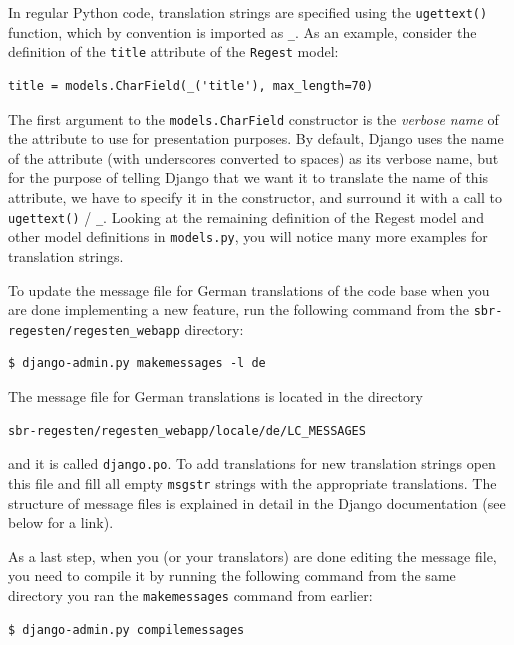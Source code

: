 In regular Python code, translation strings are specified using the
\texttt{ugettext()} function, which by convention is imported as
\texttt{\_}. As an example, consider the definition of the
\texttt{title} attribute of the \texttt{Regest} model:

\begin{verbatim}
title = models.CharField(_('title'), max_length=70)
\end{verbatim}

The first argument to the \texttt{models.CharField} constructor is the
\emph{verbose name} of the attribute to use for presentation purposes.
By default, Django uses the name of the attribute (with underscores
converted to spaces) as its verbose name, but for the purpose of
telling Django that we want it to translate the name of this
attribute, we have to specify it in the constructor, and surround it
with a call to \texttt{ugettext()} / \texttt{\_}. Looking at the
remaining definition of the Regest model and other model definitions
in \texttt{models.py}, you will notice many more examples for
translation strings.

To update the message file for German translations of the code base
when you are done implementing a new feature, run the following
command from the \texttt{sbr-regesten/regesten\_webapp} directory:

\begin{verbatim}
$ django-admin.py makemessages -l de
\end{verbatim}

The message file for German translations is located in the directory

\begin{verbatim}
sbr-regesten/regesten_webapp/locale/de/LC_MESSAGES
\end{verbatim}

and it is called \texttt{django.po}. To add translations for new
translation strings open this file and fill all empty \texttt{msgstr}
strings with the appropriate translations. The structure of message
files is explained in detail in the Django documentation (see below
for a link).

As a last step, when you (or your translators) are done editing the
message file, you need to compile it by running the following command
from the same directory you ran the \texttt{makemessages} command from
earlier:

\begin{verbatim}
$ django-admin.py compilemessages
\end{verbatim}

